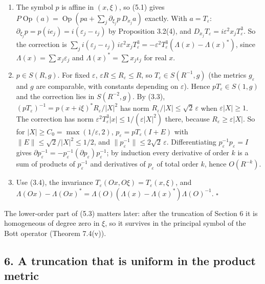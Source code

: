 \documentclass[
  11pt,
]{article}
\begin{document}
\begin{enumerate}
\def\labelenumi{(\arabic{enumi})}
\setcounter{enumi}{1}
\item
  The symbol \(p\) is affine in \((x,\xi)\), so (5.1) gives
  \(P\operatorname{Op}(a)=\operatorname{Op}(pa+\sum_j\partial_{\xi_j}p\,D_{x_j}a)\)
  exactly. With \(a=T_\varepsilon\):
  \(\partial_{\xi_j}p=p(ie_j)=i(\varepsilon_j-\iota_j)\) by Proposition
  3.2(4), and \(D_{x_j}T_\varepsilon=i\varepsilon^2x_jT_\varepsilon^3\).
  So the correction is
  \(\sum_j i(\varepsilon_j-\iota_j)\,i\varepsilon^2x_jT_\varepsilon^3=-\varepsilon^2T_\varepsilon^3(\Lambda(x)-\Lambda(x)^*)\),
  since \(\Lambda(x)=\sum x_j\varepsilon_j\) and
  \(\Lambda(x)^*=\sum x_j\iota_j\) for real \(x\).
\item
  \(p\in S(R,g)\). For fixed \(\varepsilon\),
  \(\varepsilon R\le R_\varepsilon\le R\), so
  \(T_\varepsilon\in S(R^{-1},g)\) (the metrics \(g_\varepsilon\) and
  \(g\) are comparable, with constants depending on \(\varepsilon\)).
  Hence \(pT_\varepsilon\in S(1,g)\) and the correction lies in
  \(S(R^{-2},g)\). By (3.3),
  \((pT_\varepsilon)^{-1}=p(x+i\xi)^*R_\varepsilon/|X|^2\) has norm
  \(R_\varepsilon/|X|\le\sqrt2\,\varepsilon\) when
  \(\varepsilon|X|\ge1\). The correction has norm
  \(\varepsilon^2T_\varepsilon^3|x|\le1/(\varepsilon|X|^2)\) there,
  because \(R_\varepsilon\ge\varepsilon|X|\). So for
  \(|X|\ge C_0=\max(1/\varepsilon,2)\),
  \(p_\varepsilon=pT_\varepsilon(I+E)\) with
  \(\|E\|\le\sqrt2/|X|^2\le1/2\), and
  \(\|p_\varepsilon^{-1}\|\le2\sqrt2\,\varepsilon\). Differentiating
  \(p_\varepsilon^{-1}p_\varepsilon=I\) gives
  \(\partial p_\varepsilon^{-1}=-p_\varepsilon^{-1}(\partial p_\varepsilon)p_\varepsilon^{-1}\);
  by induction every derivative of order \(k\) is a sum of products of
  \(p_\varepsilon^{-1}\) and derivatives of \(p_\varepsilon\) of total
  order \(k\), hence \(O(R^{-k})\).
\item
  Use (3.4), the invariance
  \(T_\varepsilon(Ox,O\xi)=T_\varepsilon(x,\xi)\), and
  \(\Lambda(Ox)-\Lambda(Ox)^*=\Lambda(O)(\Lambda(x)-\Lambda(x)^*)\Lambda(O)^{-1}\).
  \(\square\)
\end{enumerate}

The lower-order part of (5.3) matters later: after the truncation of
Section 6 it is homogeneous of degree zero in \(\xi\), so it survives in
the principal symbol of the Bott operator (Theorem 7.4(v)).

\subsection{6. A truncation that is uniform in the product
metric}\label{a-truncation-that-is-uniform-in-the-product-metric}
\end{document}
